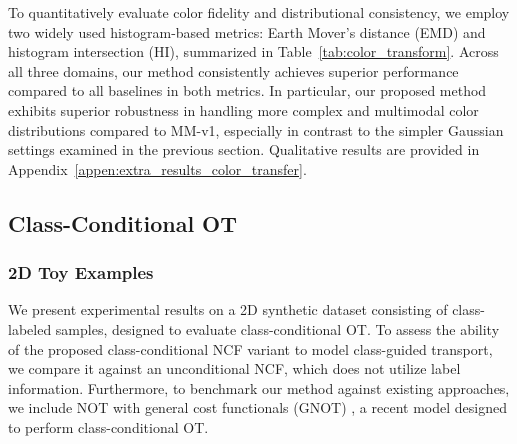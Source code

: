 \documentclass{article} %
\theoremstyle{plain}
\theoremstyle{definition}
\theoremstyle{remark}
\begin{document}
To quantitatively evaluate color fidelity and distributional consistency, we employ two widely used histogram-based metrics: Earth Mover’s distance (EMD) and histogram intersection (HI), summarized in Table~\ref{tab:color_transform}. Across all three domains, our method consistently achieves superior performance compared to all baselines in both metrics. In particular, our proposed method exhibits superior robustness in handling more complex and multimodal color distributions compared to MM-v1, especially in contrast to the simpler Gaussian settings examined in the previous section. Qualitative results are provided in Appendix~\ref{appen:extra_results_color_transfer}.
\begin{table}[t]
\centering
\caption{\textit{Quantitative evaluation of color transfer.} Earth mover distance (EMD) and histogram intersection (HI) between color distributions of target and transported images are reported.}
\label{tab:color_transform}
\end{table}


\vspace{-0.15cm}

\subsection{Class-Conditional OT}\vspace{-0.2em}

\subsubsection{2D Toy Examples}\label{sec:2D_conditional}\vspace{-0.5em}
We present experimental results on a 2D synthetic dataset consisting of class-labeled samples, designed to evaluate class-conditional OT. 
To assess the ability of the proposed class-conditional NCF variant to model class-guided transport, we compare it against an unconditional NCF, which does not utilize label information. Furthermore, to benchmark our method against existing approaches, we include NOT with general cost functionals (GNOT) \citep{asadulaev2022neural}, a recent model designed to perform class-conditional OT.
\end{document}
